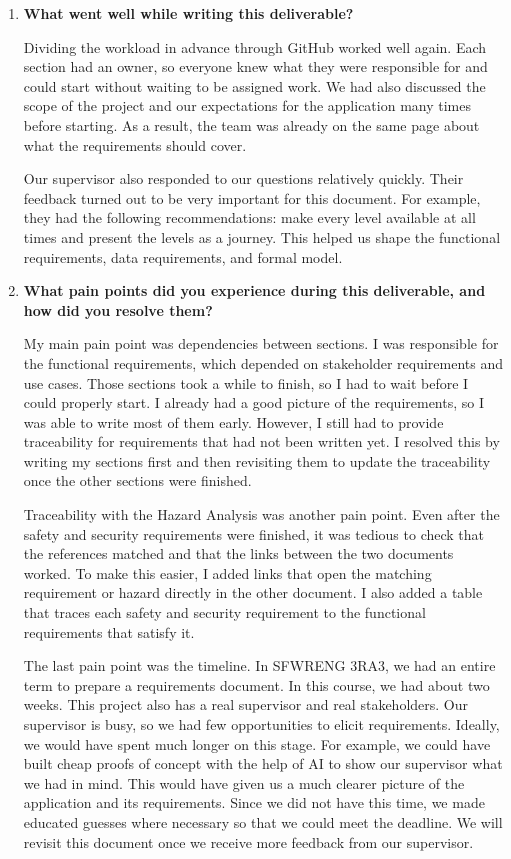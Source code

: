 \documentclass[10pt]{article}
\begin{document}
\begin{enumerate}

    \item \textbf{What went well while writing this deliverable?}

    Dividing the workload in advance through GitHub worked well again.
    Each section had an owner, so everyone knew what they were
    responsible for and could start without waiting to be assigned
    work. We had also discussed the scope of the project and our
    expectations for the application many times before starting.
    As a result, the team was already on the same page about what
    the requirements should cover.

    Our supervisor also responded to our questions relatively quickly. Their
    feedback turned out to be very important for this document. For
    example, they had the following recommendations: make every level available at
    all times and present the levels as a journey. This helped us shape the
    functional requirements, data requirements, and formal
    model.

    \item \textbf{What pain points did you experience during this
    deliverable, and how did you resolve them?}

    My main pain point was dependencies between sections. I was
    responsible for the functional requirements, which depended on
    stakeholder requirements and use cases. Those sections took
    a while to finish, so I had to wait before I could properly start.
    I already had a good picture of the requirements, so I was able
    to write most of them early. However, I still had to provide
    traceability for requirements that had not been written yet. 
    I resolved this by writing my sections first and
    then revisiting them to update the traceability once the other
    sections were finished.

    Traceability with the Hazard Analysis was another pain point.
    Even after the safety and security requirements were finished,
    it was tedious to check that the references matched and that the
    links between the two documents worked. To make this easier, I
    added links that open the matching requirement or hazard directly
    in the other document. I also added a table that traces each
    safety and security requirement to the functional requirements
    that satisfy it.

    The last pain point was the timeline. In SFWRENG 3RA3, we had an
    entire term to prepare a requirements document. In this course,
    we had about two weeks. This project also has a real supervisor
    and real stakeholders. Our supervisor is busy, so we had few
    opportunities to elicit requirements. Ideally, we would have
    spent much longer on this stage. For example, we could have built
    cheap proofs of concept with the help of AI to show our supervisor
    what we had in mind. This would have given us a much clearer
    picture of the application and its requirements. Since we did not
    have this time, we made educated guesses where necessary so that
    we could meet the deadline. We will revisit this document once we
    receive more feedback from our supervisor.


\end{enumerate}
\end{document}
